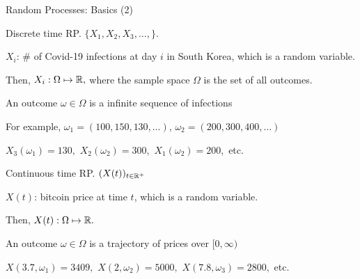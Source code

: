 \begin{frame}{Random Processes: Basics (2)}
  
\plitemsep 0.05in
\bci
  
\item<1-> \exam Discrete time RP. $\{ X_1, X_2, X_3, \ldots, \}.$ 
  
\bci
\item<2-> $X_i$: \# of Covid-19 infections at day  $i$ in South Korea, which is a random variable.
\item<3-> Then, $X_i: \Omega\mapsto {\mathbb R},$ where the sample space
  $\Omega$ is the set of all outcomes. 
  
\item<4-> An outcome $\omega \in \Omega$ is a infinite sequence of infections


\item<5-> For example, $\omega_1 = (100,150, 130, \ldots)$, $\omega_2 = (200,300, 400, \ldots)$
\item<6-> $X_3(\omega_1) = 130,$ $X_2(\omega_2) = 300,$ $X_1(\omega_2) =  200,$ etc.
  
  \eci

  \item<7-> \exam Continuous time RP. $(X(t))_{t \in {\mathbb R}^+}$ 
  
\bci
\item<8-> $X(t)$: bitcoin price at time $t$, which is a random variable.
\item<9-> Then, $X(t): \Omega\mapsto {\mathbb R}.$ 
  
\item<10-> An outcome $\omega \in \Omega$ is a trajectory of prices over $[0,\infty)$

\item<11-> $X(3.7, \omega_1) = 3409,$ $X(2,\omega_2) = 5000,$ $X(7.8,\omega_3) = 2800,$ etc.
  
  \eci



  \eci
\end{frame}


